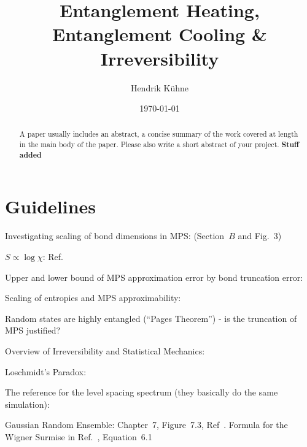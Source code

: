 \documentclass[reprint,amsmath,amssymb,aps,prb]{revtex4-2}
\begin{document}
    \title{Entanglement Heating, Entanglement Cooling \& Irreversibility}
    \author{Hendrik Kühne}
    \date{\today}

    \begin{abstract}
        A paper usually includes an abstract, a concise summary of the work covered at length in the main body of the paper. Please also write a short abstract of your project.
        \textbf{Stuff added}
    \end{abstract}

    \maketitle

    \section{Guidelines}

    \cite{Shaffer:2014:IrreversibilityAndEntanglement,Jizba:2004:MultifractalThermodynamics,Odavic:2023:RandomUnitaries}

    Investigating scaling of bond dimensions in MPS: \cite{Pirvu:2012:FiniteSizeVersusFiniteEntanglement} (Section~$B$
    and Fig.~3)

    $S\propto\log\chi$: Ref.~\cite{Pollmann:2009:FiniteEntanglementScaling}

    Upper and lower bound of MPS approximation error by bond truncation error: \cite{Verstraete:2006:faithfulMPS}

    Scaling of entropies and MPS approximability: \cite{Schuch:2008:EntropyScaling}

    Random states are highly entangled (``Pages Theorem'') \cite{Page:1993:AverageEntropy} - is the truncation of MPS justified?

    Overview of Irreversibility and Statistical Mechanics: \cite{Haar:1955:FoundationsStatisticalMechanics}

    Loschmidt's Paradox: \cite{Loschmidt:1876:LoschmidtParadox}

    The reference for the level spacing spectrum (they basically do the same simulation): \cite{Chamon:2014:EmergentIrreversibility}

    Gaussian Random Ensemble: Chapter~7, Figure~7.3, Ref~\cite{Mehta:2003:RandomMatrices}. Formula for the Wigner
    Surmise in Ref.~\cite{Guler:2007:RandomMatrixTheoryIntrodution}, Equation~6.1

    

    \appendix
\end{document}
